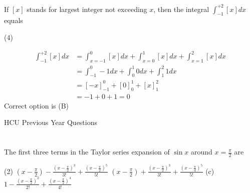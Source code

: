 \begin{questions}
\section*{}

\begin{minipage}{\textwidth}
	\question If $[x]$ stands for largest integer not exceeding $x$, then the integral $\int_{-1}^{+2}[x] d x$ equals
\end{minipage}

\begin{tasks}(4)
\end{tasks}
\begin{answer}
	\begin{align*}
	\int_{-1}^{+2}[x] d x&=\int_{x=-1}^{0}[x] d x+\int_{x=0}^{1}[x] d x+\int_{x=1}^{2}[x] d x \\
	&=\int_{-1}^{0} -1 d x+\int_{0}^{1} 0 d x+\int_{1}^{2} 1 d x\\
	&=\left[-x \right]_{-1} ^{0}+\left[0 \right]_{0} ^{1}+\left[x \right]_{1} ^{2}\\
	&=-1+0+1=0
	\end{align*}
	Correct option is (B)
\end{answer}


\begin{abox}
	HCU Previous Year Questions
\end{abox}
\section*{}

\begin{minipage}{\textwidth}
	\question  The first three terms in the Taylor series expansion of $\sin x$ around $x=\frac{\pi}{2}$ are 
	{}
\end{minipage}
\begin{tasks}(2)
	\task[\textbf{A.}]$\left(x-\frac{\pi}{2}\right)-\frac{\left(x-\frac{\pi}{2}\right)^{3}}{3 !}+\frac{\left(x-\frac{\pi}{2}\right)^{5}}{5 !}$ 
	\task[\textbf{B.}]$\left(x-\frac{\pi}{2}\right)+\frac{\left(x-\frac{\pi}{2}\right)^{3}}{3 !}+\frac{\left(x-\frac{\pi}{4}\right)^{5}}{5 !}$ 
	\task[\textbf{C.}] (c) $1-\frac{\left(x-\frac{\pi}{2}\right)^{2}}{2 !}+\frac{\left(x-\frac{\pi}{2}\right)^{4}}{4 !}$
	

\end{tasks}
\end{questions}
